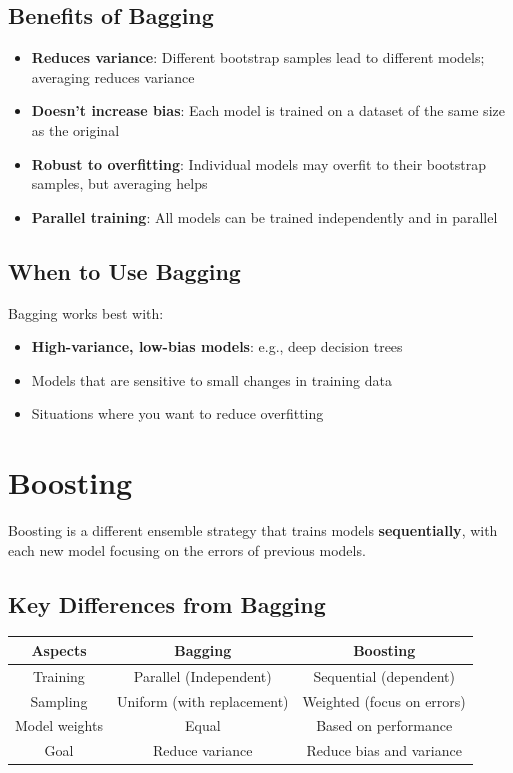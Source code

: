 \documentclass[a4paper]{article}
\theoremstyle{definition}
\begin{document}
\subsection{Benefits of Bagging}
\begin{itemize}
    \item \textbf{Reduces variance}: Different bootstrap samples lead to different models; averaging reduces variance 
    \item \textbf{Doesn't increase bias}: Each model is trained on a dataset of the same size as the original 
    \item \textbf{Robust to overfitting}: Individual models may overfit to their bootstrap samples, but averaging helps 
    \item \textbf{Parallel training}: All models can be trained independently and in parallel
\end{itemize}
\subsection{When to Use Bagging}
Bagging works best with:
\begin{itemize}
    \item \textbf{High-variance, low-bias models}: e.g., deep decision trees 
    \item Models that are sensitive to small changes in training data 
    \item Situations where you want to reduce overfitting
\end{itemize}
\section{Boosting}
Boosting is a different ensemble strategy that trains models \textbf{sequentially}, with each new model focusing on the errors of 
previous models.
\subsection{Key Differences from Bagging}
\begin{table}
    \centering
    \begin{tabular}{|c|c|c|}
        \hline 
        \textbf{Aspects} & \textbf{Bagging} & \textbf{Boosting}\\
        \hline 
        Training & Parallel (Independent) & Sequential (dependent) \\
        \hline 
        Sampling & Uniform (with replacement) & Weighted (focus on errors)\\
        \hline 
        Model weights & Equal & Based on performance \\
        \hline 
        Goal & Reduce variance & Reduce bias and variance \\
        \hline
    \end{tabular}
\end{table}
\end{document}

